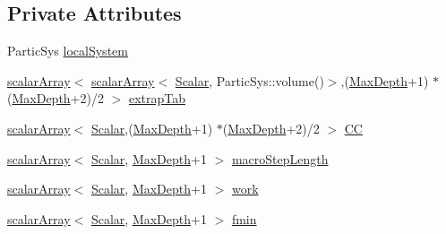 \subsection*{Private Attributes}
\begin{DoxyCompactItemize}
\item 
Partic\+Sys \mbox{\hyperlink{class_b_s_iterator_a9d6fc5f237246465161ea86854985395}{local\+System}}
\item 
\mbox{\hyperlink{class_b_s_iterator_ab0aa7c10b56500273af05dcd85fd8389}{scalar\+Array}}$<$ \mbox{\hyperlink{class_b_s_iterator_ab0aa7c10b56500273af05dcd85fd8389}{scalar\+Array}}$<$ \mbox{\hyperlink{class_b_s_iterator_a7857f8ff9032955ea4dcc22cd18ca7a1}{Scalar}}, Partic\+Sys\+::volume()$>$,(\mbox{\hyperlink{class_b_s_iterator_a39409b9a12d4854d101ce59a0efc0f74}{Max\+Depth}}+1) $\ast$(\mbox{\hyperlink{class_b_s_iterator_a39409b9a12d4854d101ce59a0efc0f74}{Max\+Depth}}+2)/2 $>$ \mbox{\hyperlink{class_b_s_iterator_aa501e973f342248fc445d59a5166ccc9}{extrap\+Tab}}
\item 
\mbox{\hyperlink{class_b_s_iterator_ab0aa7c10b56500273af05dcd85fd8389}{scalar\+Array}}$<$ \mbox{\hyperlink{class_b_s_iterator_a7857f8ff9032955ea4dcc22cd18ca7a1}{Scalar}},(\mbox{\hyperlink{class_b_s_iterator_a39409b9a12d4854d101ce59a0efc0f74}{Max\+Depth}}+1) $\ast$(\mbox{\hyperlink{class_b_s_iterator_a39409b9a12d4854d101ce59a0efc0f74}{Max\+Depth}}+2)/2 $>$ \mbox{\hyperlink{class_b_s_iterator_a28f6cc2fd6bfd554f85225492f4210b7}{CC}}
\item 
\mbox{\hyperlink{class_b_s_iterator_ab0aa7c10b56500273af05dcd85fd8389}{scalar\+Array}}$<$ \mbox{\hyperlink{class_b_s_iterator_a7857f8ff9032955ea4dcc22cd18ca7a1}{Scalar}}, \mbox{\hyperlink{class_b_s_iterator_a39409b9a12d4854d101ce59a0efc0f74}{Max\+Depth}}+1 $>$ \mbox{\hyperlink{class_b_s_iterator_a96c58777cbefe7d02e160317621fc0b9}{macro\+Step\+Length}}
\item 
\mbox{\hyperlink{class_b_s_iterator_ab0aa7c10b56500273af05dcd85fd8389}{scalar\+Array}}$<$ \mbox{\hyperlink{class_b_s_iterator_a7857f8ff9032955ea4dcc22cd18ca7a1}{Scalar}}, \mbox{\hyperlink{class_b_s_iterator_a39409b9a12d4854d101ce59a0efc0f74}{Max\+Depth}}+1 $>$ \mbox{\hyperlink{class_b_s_iterator_ac2a338d6c3e5014d529666032d34c987}{work}}
\item 
\mbox{\hyperlink{class_b_s_iterator_ab0aa7c10b56500273af05dcd85fd8389}{scalar\+Array}}$<$ \mbox{\hyperlink{class_b_s_iterator_a7857f8ff9032955ea4dcc22cd18ca7a1}{Scalar}}, \mbox{\hyperlink{class_b_s_iterator_a39409b9a12d4854d101ce59a0efc0f74}{Max\+Depth}}+1 $>$ \mbox{\hyperlink{class_b_s_iterator_a05bf5c727d23e47349683cda1a08ed13}{fmin}}

\end{DoxyCompactItemize}
